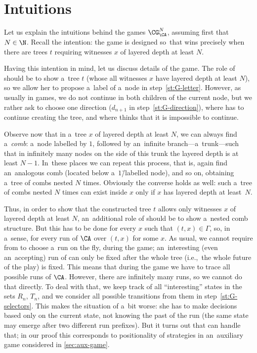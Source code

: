 \section{Intuitions}
\label{sec:intuitions}

Let us explain the intuitions behind the games $\CG^N_\CA$, assuming first that $N\in\N$.
Recall the intention: the game is designed so~that \eve wins precisely when there are trees $t$ requiring witnesses $x$ of layered depth at least $N$.

Having this intention in mind, let us discuss details of the game.
The role of \eve should be to show a~tree $t$ (whose all witnesses $x$ have layered depth at least $N$), so we allow her to propose a~label of a~node in step~\ref{st:G-letter}.
However, as usually in games, we do not continue in both children of the current node, but we rather ask \adam to choose one direction ($d_{n+1}$ in step~\ref{st:G-direction}),
where \eve has to continue creating the tree, and where \adam thinks that it is impossible to continue.

Observe now that in a~tree $x$ of layered depth at least $N$, we can always find a~\emph{comb}:
a~node labelled by $1$, followed by an~infinite branch---a~trunk---such that in infinitely many nodes on the side of this trunk the layered depth is at least $N{-}1$.
In~these places we can repeat this process, that is, again find an~analogous comb (located below a~$1$\=/labelled node), and so on, obtaining a~tree of combs nested $N$ times.
Obviously the converse holds as well: such a~tree of combs nested $N$ times can exist inside $x$ only if $x$ has layered depth at least~$N$.

Thus, in order to show that the constructed tree $t$ allows only witnesses $x$ of layered depth at least $N$, an~additional role of \eve should be to show a~nested comb structure.
But this has to be done for every $x$ such that $(t,x)\in\Gamma$, so, in a~sense, for every run of $\CA$ over $(t,x)$ for some $x$.
As usual, we cannot require from \adam to choose a~run on the fly, during the game;
an~interesting (even an~accepting) run of \CA can only be fixed after the whole tree (i.e.,~the whole future of the play) is fixed.
This means that during the game we have to trace all possible runs of $\CA$.
However, there are infinitely many runs, so we cannot do that directly.
To deal with that, we keep track of all ``interesting'' states in the sets $R_n$, $T_n$,
and we consider all possible transitions from them in step~\ref{st:G-selectors}.
This makes the situation of \eve a~bit worse: she has to make decisions based only on the current state, not knowing the past of the run
(the same state may emerge after two different run prefixes).
But it turns out that \eve can handle that; in our proof this corresponds to positionality of strategies in an~auxiliary game considered in \cref{sec:aux-game}.

